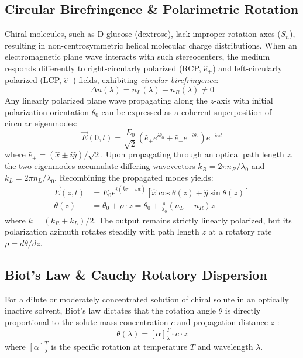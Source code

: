 \documentclass[twocolumn,10pt,a4paper]{article}
\begin{document}
\subsection{Circular Birefringence \& Polarimetric Rotation}
Chiral molecules, such as D-glucose (dextrose), lack improper rotation axes ($S_n$), resulting in non-centrosymmetric helical molecular charge distributions. When an electromagnetic plane wave interacts with such stereocenters, the medium responds differently to right-circularly polarized (RCP, $\hat{e}_+$) and left-circularly polarized (LCP, $\hat{e}_-$) fields, exhibiting \textit{circular birefringence}:
\begin{equation}
  \Delta n(\lambda) = n_L(\lambda) - n_R(\lambda) \neq 0
  \label{eq:circ_birefringence}
\end{equation}
Any linearly polarized plane wave propagating along the $z$-axis with initial polarization orientation $\theta_0$ can be expressed as a coherent superposition of circular eigenmodes:
\begin{equation}
  \vec{E}(0, t) = \frac{E_0}{\sqrt{2}} \left( \hat{e}_+ e^{i\theta_0} + \hat{e}_- e^{-i\theta_0} \right) e^{-i\omega t}
  \label{eq:e_field_decomposition}
\end{equation}
where $\hat{e}_\pm = (\hat{x} \pm i\hat{y})/\sqrt{2}$. Upon propagating through an optical path length $z$, the two eigenmodes accumulate differing wavevectors $k_R = 2\pi n_R / \lambda_0$ and $k_L = 2\pi n_L / \lambda_0$. Recombining the propagated modes yields:
\begin{align}
  \vec{E}(z, t) &= E_0 e^{i(\bar{k}z - \omega t)} \left[ \hat{x} \cos\theta(z) + \hat{y} \sin\theta(z) \right] \label{eq:rotated_e_field} \\
  \theta(z) &= \theta_0 + \rho \cdot z = \theta_0 + \frac{\pi}{\lambda_0}(n_L - n_R)z
  \label{eq:rot_angle}
\end{align}
where $\bar{k} = (k_R + k_L)/2$. The output remains strictly linearly polarized, but its polarization azimuth rotates steadily with path length $z$ at a rotatory rate $\rho = d\theta/dz$.

\subsection{Biot's Law \& Cauchy Rotatory Dispersion}
For a dilute or moderately concentrated solution of chiral solute in an optically inactive solvent, Biot's law dictates that the rotation angle $\theta$ is directly proportional to the solute mass concentration $c$ and propagation distance $z$ \cite{biot1815}:
\begin{equation}
  \theta(\lambda) = [\alpha]_\lambda^T \cdot c \cdot z
  \label{eq:biot_law}
\end{equation}
where $[\alpha]_\lambda^T$ is the specific rotation at temperature $T$ and wavelength $\lambda$. 
\end{document}
